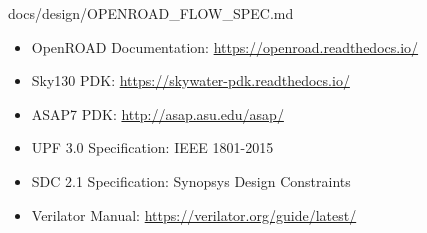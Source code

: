 \begin{relocated}{docs/design/OPENROAD_FLOW_SPEC.md}
\begin{itemize}
\tightlist
\item
  OpenROAD Documentation:
  \href{https://openroad.readthedocs.io/}{https:/\allowbreak{}/\allowbreak{}openroad.readthedocs.io/}
\item
  Sky130 PDK:
  \href{https://skywater-pdk.readthedocs.io/}{https:/\allowbreak{}/\allowbreak{}skywater-pdk.readthedocs.io/}
\item
  ASAP7 PDK:
  \href{http://asap.asu.edu/asap/}{http:/\allowbreak{}/\allowbreak{}asap.asu.edu/\allowbreak{}asap/}
\item
  UPF 3.0 Specification: IEEE 1801-2015
\item
  SDC 2.1 Specification: Synopsys Design Constraints
\item
  Verilator Manual:
  \href{https://verilator.org/guide/latest/}{https:/\allowbreak{}/\allowbreak{}verilator.org/\allowbreak{}guide/\allowbreak{}latest/}
\end{itemize}
\end{relocated}

